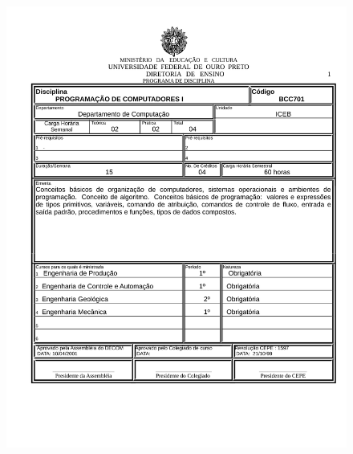 \begin{figure}[p]
	\centering 
	\includegraphics[scale=0.7]{capitulos/anexo1-programas-disciplina/p12.pdf}
\end{figure}

